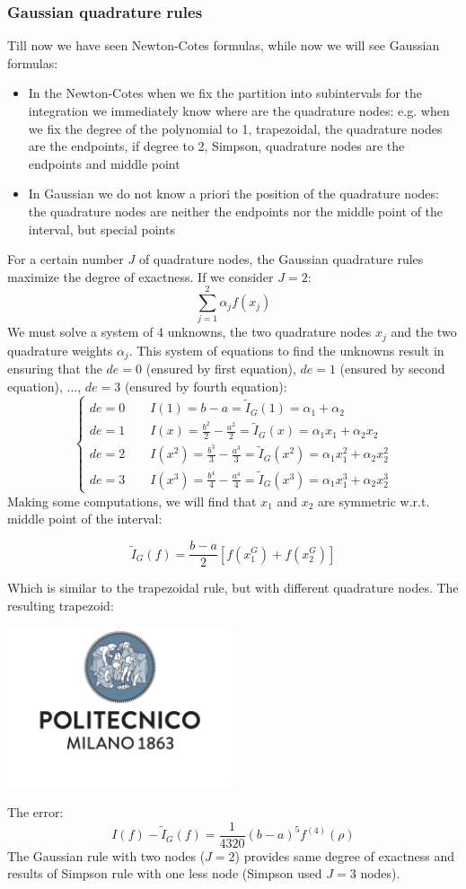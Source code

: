 \subsubsection{Gaussian quadrature rules}
Till now we have seen Newton-Cotes formulas, while now we will see Gaussian formulas:
\begin{itemize}
    \item In the Newton-Cotes when we fix the partition into subintervals for the integration we immediately know where are the quadrature nodes: e.g. when we fix the degree of the polynomial to 1, trapezoidal, the quadrature nodes are the endpoints, if degree to 2, Simpson, quadrature nodes are the endpoints and middle point
    \item In Gaussian we do not know a priori the position of the quadrature nodes: the quadrature nodes are neither the endpoints nor the middle point of the interval, but special points
\end{itemize}
For a certain number $J$ of quadrature nodes, the Gaussian quadrature rules maximize the degree of exactness. If we consider $J=2$:
$$
\sum_{j=1}^2\alpha_jf(x_j)
$$
We must solve a system of 4 unknowns, the two quadrature nodes $x_j$ and the two quadrature weights $\alpha_j$. This system of equations to find the unknowns result in ensuring that the $de=0$ (ensured by first equation), $de=1$ (ensured by second equation), ..., $de=3$ (ensured by fourth equation):
$$
\begin{cases}
    de=0\qquad I(1)=b-a=\tilde{I}_G(1)=\alpha_1+\alpha_2\\
    de=1\qquad I(x)=\frac{b^2}{2}-\frac{a^2}{2}=\tilde{I}_G(x)=\alpha_1x_1+\alpha_2x_2\\
    de=2\qquad I(x^2)=\frac{b^3}{3}-\frac{a^3}{3}=\tilde{I}_G(x^2)=\alpha_1x_1^2+\alpha_2x_2^2\\
    de=3\qquad I(x^3)=\frac{b^4}{4}-\frac{a^4}{4}=\tilde{I}_G(x^3)=\alpha_1x_1^3+\alpha_2x_2^3
\end{cases}
$$
Making some computations, we will find that $x_1$ and $x_2$ are symmetric w.r.t. middle point of the interval:
\begin{LARGE}
    $$
    \tilde{I}_G(f)=\frac{b-a}{2}\left[
        f(x_1^G)+
        f(x_2^G)
    \right]
    $$
\end{LARGE}
Which is similar to the trapezoidal rule, but with different quadrature nodes. The resulting trapezoid:
\begin{center}
    \includegraphics[width=0.5\textwidth]{images/logo.pdf}
\end{center}
The error:
$$
I(f)-\tilde{I}_G(f)=\frac{1}{4320}(b-a)^5f^{(4)}(\rho)
$$
The Gaussian rule with two nodes ($J=2$) provides same degree of exactness and results of Simpson rule with one less node (Simpson used $J=3$ nodes).

